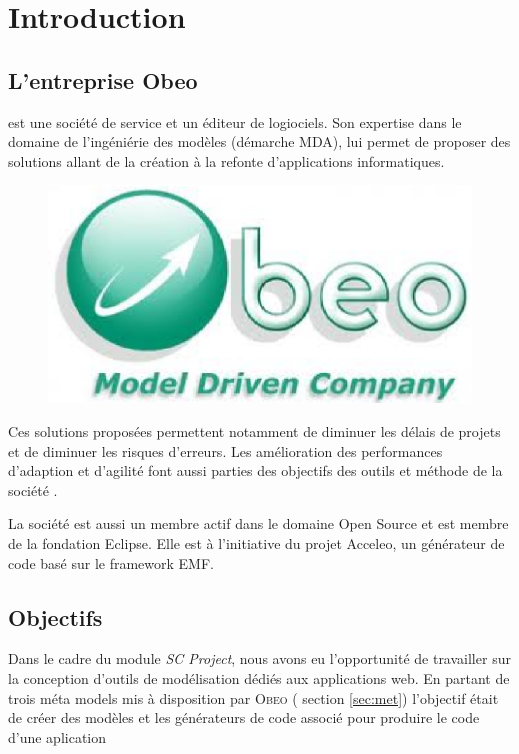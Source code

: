 \chapter{Introduction}\label{chap:Intro}

\section{L'entreprise Obeo}
\obeo{} est une société de service et un éditeur de logiociels. Son expertise dans le domaine de l'ingéniérie des modèles (démarche MDA), lui permet de proposer des solutions allant de la création à la refonte d'applications informatiques. 


\begin{figure}[htb]
  \centering
  \includegraphics[scale=.4]{img/logoobeo.eps}
  \label{fig:obeo}
\end{figure}

Ces solutions proposées permettent notamment de diminuer les délais de projets et de diminuer les risques d'erreurs. Les amélioration des performances d'adaption et d'agilité font aussi parties des objectifs des outils et méthode de la société \obeo{}.




La société \obeo{} est aussi un membre actif dans le domaine Open Source et est membre de la fondation Eclipse. Elle est à l'initiative du projet Acceleo, un générateur de code basé sur le framework EMF. 


\section{Objectifs}
Dans le cadre du module \emph{SC Project}, nous avons eu l'opportunité de travailler sur la conception d'outils de modélisation dédiés aux applications web. En partant de trois méta models mis à disposition par \textsc{Obeo}
(\cf{} section \ref{sec:met}) l'objectif était de créer des modèles et les générateurs de code associé pour produire le code d'une aplication
